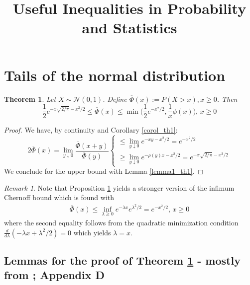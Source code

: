 \documentclass[]{interact}
\theoremstyle{plain}%
\newtheorem{theorem}{Theorem}[section]
\theoremstyle{definition}
\theoremstyle{remark}
\newtheorem{remark}{Remark}
\begin{document}
	
	
\title{Useful Inequalities in Probability and Statistics}

\author{
}

\maketitle

\section{Tails of the normal distribution}

\begin{theorem}  
\label{th1}	
Let $X \sim \mathcal{N}(0,1)$. Define $\overline{\Phi}(x):=P(X>x),x\geq 0$. Then
$$\boxed{\frac{1}{2}e^{-x\sqrt{2/\pi}-x^2/2}\leq \overline{\Phi}(x)\leq \min\bigg(\frac{1}{2}e^{-x^2/2},\frac{1}{x}\phi(x)\bigg),\,x\geq 0}$$
\end{theorem}
\begin{proof} We have, by continuity and Corollary \ref{corol_th1}:
$$2\overline{\Phi}(x)=\lim_{y\downarrow 0}\frac{\overline{\Phi}(x+y)}{\overline{\Phi}(y)}
\begin{cases}
\leq \lim_{y\downarrow 0}e^{-xy-x^2/2}=e^{-x^2/2}\\
\geq \lim_{y\downarrow 0}e^{-\rho(y)x-x^2/2}=e^{-x\sqrt{2/\pi}-x^2/2}
\end{cases}
$$
We conclude for the upper bound with Lemma \ref{lemma1_th1}.
\end{proof}

\begin{remark} Note that Proposition \ref{th1} yields a stronger version of the infimum Chernoff bound which is found with
$$\begin{aligned}\overline{\Phi}(x)\leq \inf_{\lambda \geq 0}e^{-\lambda x}e^{\lambda^2/2}=e^{-x^2/2},\,x\geq 0
\end{aligned}$$
where the second equality follows from the quadratic minimization condition $\frac{d}{d\lambda}(-\lambda x+\lambda^2/2)=0$ which yields $\lambda=x$.
\end{remark}

\subsection{Lemmas for the proof of Theorem \ref{th1} - mostly from \cite{PollardUGMTP}; Appendix D}
\end{document}
